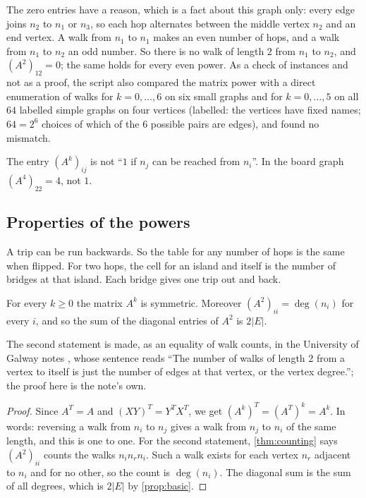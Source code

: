 The zero entries have a reason, which is a fact about this graph only:
every edge joins $n_2$ to $n_1$ or $n_3$, so each hop alternates between
the middle vertex $n_2$ and an end vertex. A walk from $n_1$ to $n_1$ makes
an even number of hops, and a walk from $n_1$ to $n_2$ an odd number. So there is no walk of length
$2$ from $n_1$ to $n_2$, and $(A^2)_{12}=0$; the same holds for every even
power. As a check
of instances and not as a proof, the script also compared the matrix power
with a direct enumeration of walks for $k=0,\dots,6$ on six small graphs and
for $k=0,\dots,5$ on all $64$ labelled simple graphs on four vertices (labelled: the vertices
have fixed names; $64=2^6$ choices of which
of the $6$ possible pairs are edges), and
found no mismatch.

\begin{nonexample}\label{ex:notreach}
The entry $(A^k)_{ij}$ is not ``$1$ if $n_j$ can be reached from $n_i$''.
In the board graph $(A^4)_{22}=4$, not $1$.
\end{nonexample}

\subsection{Properties of the powers}

\plainwords{} A trip can be run backwards. So the table for any number of
hops is the same when flipped. For two hops, the cell for an island and
itself is the number of bridges at that island. Each bridge gives one trip
out and back.

\begin{proposition}\label{prop:powers}
For every $k\ge 0$ the matrix $A^k$ is symmetric. Moreover
$(A^2)_{ii}=\deg(n_i)$ for every $i$, and so the sum of the diagonal entries
of $A^2$ is $2|E|$.
\end{proposition}
The second statement is made, as an equality of walk counts, in the
University of Galway notes \cite[p.~4]{galwaynotes}, whose sentence reads
``The number of walks of length 2 from a vertex to itself is just the
number of edges at that vertex, or the vertex degree.''; the proof here is
the note's own.
\begin{proof}
Since $A^T=A$ and $(XY)^T=Y^TX^T$, we get $(A^k)^T=(A^T)^k=A^k$. In words:
reversing a walk from $n_i$ to $n_j$ gives a walk from $n_j$ to $n_i$ of the
same length, and this is one to one. For the second statement,
\cref{thm:counting} says $(A^2)_{ii}$ counts the walks $n_in_rn_i$. Such a
walk exists for each vertex $n_r$ adjacent to $n_i$ and for no other, so
the count is $\deg(n_i)$. The diagonal sum is the sum of all degrees, which is
$2|E|$ by \cref{prop:basic}.
\end{proof}

